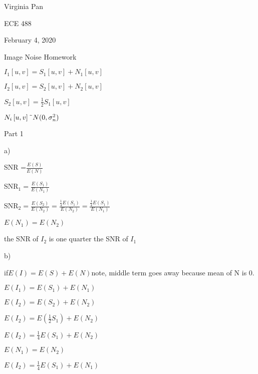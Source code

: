 \documentclass{article}
\begin{document}
Virginia Pan

ECE 488

February 4, 2020

Image Noise Homework

$I_{1}\left[ u,v\right] =S_{1}\left[ u,v\right] +N_{1}\left[ u,v\right] $

$I_{2}\left[ u,v\right] =S_{2}\left[ u,v\right] +N_{2}\left[ u,v\right] $

$S_{2}\left[ u,v\right] =\frac{1}{2}S_{1}\left[ u,v\right] $

$N_{i}\left[ u,v\right] \symbol{126}N(0,\sigma _{n}^{2})$

Part 1

a)

SNR =$\frac{E\left( S\right) }{E\left( N\right) }$

SNR$_{1}=\frac{E\left( S_{1}\right) }{E\left( N_{1}\right) }$

SNR$_{2}=\frac{E\left( S_{2}\right) }{E\left( N_{2}\right) }=\frac{\frac{1}{4%
}E\left( S_{1}\right) }{E\left( N_{2}\right) }=\frac{\frac{1}{4}E\left(
S_{1}\right) }{E\left( N_{1}\right) }$

\vspace{1pt}$E\left( N_{1}\right) =E\left( N_{2}\right) $


\vspace{1pt}the SNR of $I_{2}$ is one quarter the SNR of $I_{1}$

b)

if$E\left( I\right) =E\left( S\right) +E\left( N\right) $note, middle term
goes away because mean of N is 0.

$E\left( I_{1}\right) =E\left( S_{1}\right) +E\left( N_{1}\right) $

$E\left( I_{2}\right) =E\left( S_{2}\right) +E\left( N_{2}\right) $

$E\left( I_{2}\right) =E\left( \frac{1}{2}S_{1}\right) +E\left( N_{2}\right) 
$

$E\left( I_{2}\right) =\frac{1}{4}E\left( S_{1}\right) +E\left( N_{2}\right) 
$

$E\left( N_{1}\right) =E\left( N_{2}\right) $

$E\left( I_{2}\right) =\frac{1}{4}E\left( S_{1}\right) +E\left( N_{1}\right) 
$

\end{document}
